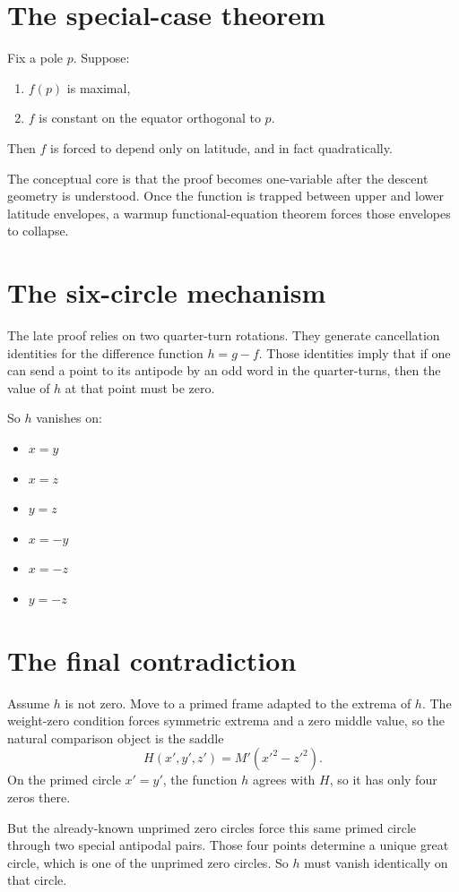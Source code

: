 \documentclass[11pt]{article}
\begin{document}
\section{The special-case theorem}
Fix a pole $p$. Suppose:
\begin{enumerate}[label=\arabic*.]
\item $f(p)$ is maximal,
\item $f$ is constant on the equator orthogonal to $p$.
\end{enumerate}
Then $f$ is forced to depend only on latitude, and in fact quadratically.

The conceptual core is that the proof becomes one-variable after the descent geometry is understood. Once the function is trapped between upper and lower latitude envelopes, a warmup functional-equation theorem forces those envelopes to collapse.

\section{The six-circle mechanism}
The late proof relies on two quarter-turn rotations. They generate cancellation identities for the difference function $h = g-f$. Those identities imply that if one can send a point to its antipode by an odd word in the quarter-turns, then the value of $h$ at that point must be zero.

So $h$ vanishes on:
\begin{itemize}[leftmargin=1.5em]
\item $x=y$
\item $x=z$
\item $y=z$
\item $x=-y$
\item $x=-z$
\item $y=-z$
\end{itemize}

\section{The final contradiction}
Assume $h$ is not zero. Move to a primed frame adapted to the extrema of $h$. The weight-zero condition forces symmetric extrema and a zero middle value, so the natural comparison object is the saddle
\[
H(x',y',z') = M'(x'^2 - z'^2).
\]
On the primed circle $x'=y'$, the function $h$ agrees with $H$, so it has only four zeros there.

But the already-known unprimed zero circles force this same primed circle through two special antipodal pairs. Those four points determine a unique great circle, which is one of the unprimed zero circles. So $h$ must vanish identically on that circle.
\end{document}
